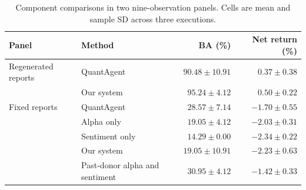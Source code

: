 \begin{table}[!htb]
\centering\small
\renewcommand{\arraystretch}{1.13}
\caption{Component comparisons in two nine-observation panels. Cells are mean and sample SD across three executions.}
\label{tab:repeats}
\begin{tabular}{@{}llrr@{}}
\toprule
Panel & Method & BA (\%) & Net return (\%)\\
\midrule
Regenerated reports & QuantAgent & $90.48\pm 10.91$ & $0.37\pm 0.38$\\
 & Our system & $95.24\pm 4.12$ & $0.50\pm 0.22$\\
\addlinespace
Fixed reports & QuantAgent & $28.57\pm 7.14$ & $-1.70\pm 0.55$\\
 & Alpha only & $19.05\pm 4.12$ & $-2.03\pm 0.31$\\
 & Sentiment only & $14.29\pm 0.00$ & $-2.34\pm 0.22$\\
 & Our system & $19.05\pm 10.91$ & $-2.23\pm 0.63$\\
 & Past-donor alpha and sentiment & $30.95\pm 4.12$ & $-1.42\pm 0.33$\\
\bottomrule
\end{tabular}
\end{table}
